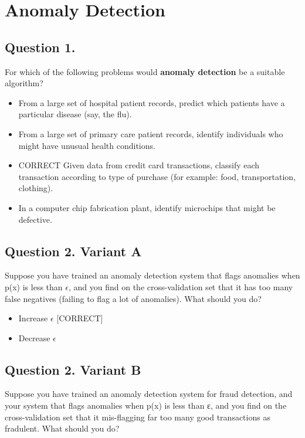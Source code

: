 \documentclass[11pt]{article} %
\begin{document}
\section{Anomaly Detection}

\subsection*{Question 1. }
For which of the following problems would \textbf{anomaly detection} be a suitable algorithm?

\begin{itemize}
	\item From a large set of hospital patient records, predict which patients have a particular disease (say, the flu).
	\item From a large set of primary care patient records, identify individuals who might have unusual health conditions.
	\item CORRECT
	Given data from credit card transactions, classify each transaction according to type of purchase (for example: food, transportation, clothing).
	\item 
	In a computer chip fabrication plant, identify microchips that might be defective.
\end{itemize}

\subsection*{Question 2. Variant A}
Suppose you have trained an anomaly detection system that flags anomalies when p(x) is less than $\epsilon$, and you find on the cross-validation set that it has 
too many false negatives (failing to flag a lot of anomalies). What should you do?


\begin{itemize}
	\item Increase $\epsilon$ [CORRECT]
	\item Decrease $\epsilon$
\end{itemize}

\subsection*{Question 2. Variant B}
Suppose you have trained an anomaly detection system for fraud detection, and your system that flags anomalies when p(x) is less than ε, and you find on the 
cross-validation set that it mis-flagging far too many good transactions as fradulent. What should you do?
\end{document}
